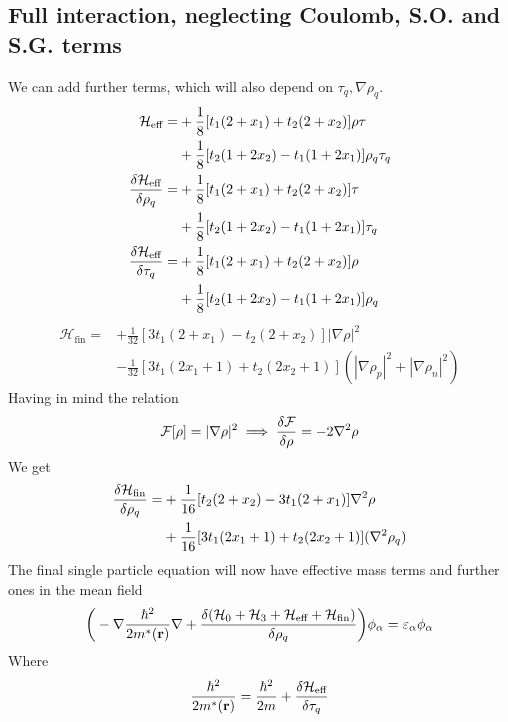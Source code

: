 \subsection{Full interaction, neglecting Coulomb, S.O. and S.G. terms}
We can add further terms, which will also depend on $\tau_q, \nabla\rho_q$.
\\
\begin{align}
    \mathcal H_\text{eff} = &+\frac 1 8 [t_1(2+x_1)+t_2(2+x_2)]\rho\tau  \\&+ \frac 1 8 [t_2(1+2x_2)-t_1(1+2x_1)]\rho_q\tau_q
    \\\fdv{\mathcal H_\text{eff}}{\rho_q} =&+ \frac 1 8 [t_1(2+x_1)+t_2(2+x_2)]\tau \\& + \frac 1 8 [t_2(1+2x_2)-t_1(1+2x_1)]\tau_q
    \\\fdv{\mathcal H_\text{eff}}{\tau_q} =&+ \frac 1 8 [t_1(2+x_1)+t_2(2+x_2)]\rho\\ &+ \frac 1 8 [t_2(1+2x_2)-t_1(1+2x_1)]\rho_q
\end{align}
\begin{align}
    \mathcal H_\text{fin} = &+\frac 1 {32} [3t_1(2+x_1)-t_2(2+x_2)] | \nabla\rho|^2 \\&- \frac 1 {32} [3t_1(2x_1+1)+t_2(2x_2+1)] ( |\nabla\rho_p| ^2 + |\nabla\rho_n|^2) 
\end{align}
Having in mind the relation 
\[\mathcal F [\rho] = |\nabla\rho|^2 \implies \fdv {\mathcal F} {\rho} = -2\nabla^2 \rho\]
We get
\begin{align}
    \fdv{\mathcal H_\text{fin}}{\rho_q} = &+ \frac 1 {16} [t_2(2+x_2)-3t_1(2+x_1)] \nabla^2 \rho \\&+ \frac 1 {16} [3t_1(2x_1+1)+t_2(2x_2+1)] ( \nabla^2 \rho_q )
\end{align}
The final single particle equation will now have effective mass terms and further ones in the mean field
\begin{align}
    \bigg(-\nabla \frac {\hbar^2}{2m^*(\mathbf r)} \nabla + \fdv{(\mathcal{H}_0 + \mathcal{H}_3 + \mathcal{H}_\text{eff} + \mathcal{H}_\text{fin})}{\rho_q} \bigg)\phi_\alpha = \varepsilon_\alpha\phi_\alpha
\end{align}
Where 
\[\frac{\hbar^2}{2m^*(\mathbf r)} = \frac{\hbar^2}{2m} + \fdv{\mathcal{H}_\text{eff}}{\tau_q}\]



